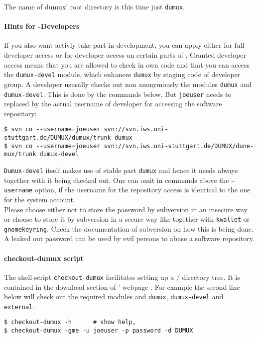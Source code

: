 The name of dumux' root directory is this time just \texttt{dumux}.

\paragraph{Hints for \Dumux-Developers}
If you also want activly take part in \Dumux development, you can apply either for full developer
access or for developer access on certain parts of \Dumux. Granted developer access means that
you are allowed to check in own code and that you can access the \texttt{dumux-devel} module,
which enhances \texttt{dumux} by staging code of developer group.
A developer ususally checks out non anonymously the modules \texttt{dumux} and \texttt{dumux-devel}.
This is done by the commands below. But \texttt{joeuser} needs to replaced by
the actual username of developer for accessing the software repository:

\begin{lstlisting}[style=Bash]
$ svn co --username=joeuser svn://svn.iws.uni-stuttgart.de/DUMUX/dumux/trunk dumux
$ svn co --username=joeuser svn://svn.iws.uni-stuttgart.de/DUMUX/dune-mux/trunk dumux-devel
\end{lstlisting}

\texttt{Dumux-devel} itself makes use of stable part \texttt{dumux} and hence it needs always together with it being checked out. 
One can omit in commands above the \texttt{--username} option, if the username for the repository access is
identical to the one for the system account.\\

Please choose either not to store the password by subversion in an insecure way or
choose to store it by subversion in a secure way like together with \texttt{kwallet} or \texttt{gnomekeyring}.
Check the documentation of subversion on how this is being done.
A leaked out password can be used by evil persons to abuse a software repository.

\paragraph{checkout-dumux script}
The shell-script \texttt{checkout-dumux} facilitates setting up a {\Dune}/{\Dumux} directory tree.
It is contained in the download section of \Dumux' webpage \cite{DUMUX-HP}.
For example the second line below will check out the required \Dune modules and \texttt{dumux}, \texttt{dumux-devel} and \texttt{external}.

\begin{lstlisting}[style=Bash]
$ checkout-dumux -h      # show help,
$ checkout-dumux -gme -u joeuser -p password -d DUMUX 
\end{lstlisting}

